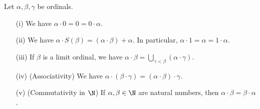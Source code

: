 \begin{proposition} \label{properties-of-ordinal-multiplication}
    Let $\alpha,\beta, \gamma$ be ordinals.
    \\

    \begin{itemize}
        \item[(i)] We have $\alpha \cdot 0 = 0 = 0 \cdot \alpha$.
        \\

        \item[(ii)] We have $\alpha \cdot S(\beta) = (\alpha \cdot \beta) + \alpha$. In particular, $\alpha \cdot 1 = \alpha = 1 \cdot \alpha$.
        \\

        \item[(iii)] If $\beta$ is a limit ordinal, we have $\alpha \cdot \beta = \bigcup_{\gamma < \beta} (\alpha \cdot \gamma)$.
        \\

        \item[(iv)] (Associativity) We have $\alpha \cdot (\beta \cdot \gamma) = (\alpha \cdot \beta) \cdot \gamma$. 
        \\

        \item[(v)] (Commutativity in $\N$) If $\alpha, \beta \in \N$ are natural numbers, then $\alpha \cdot \beta = \beta \cdot \alpha$.
        \\

    \end{itemize}
\end{proposition}

